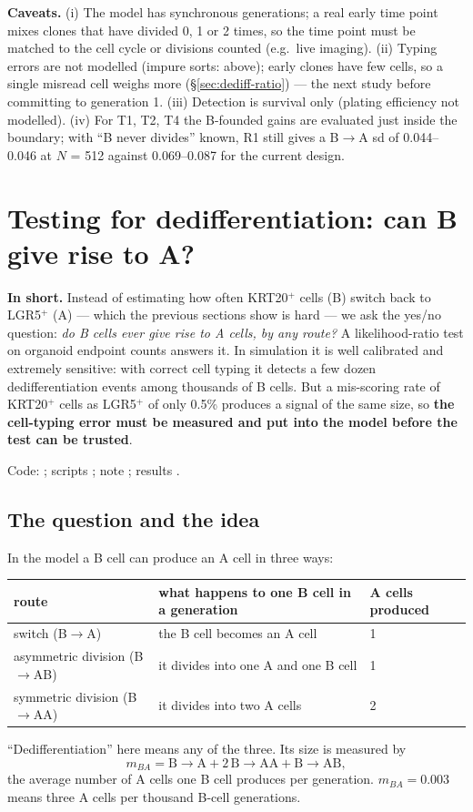 \documentclass[10pt,a4paper]{article}
\newcommand{\BA}{B$\to$A}
\begin{document}
\textbf{Caveats.} (i) The model has synchronous generations; a real early time point mixes clones that have divided 0, 1 or 2 times, so the time point must be matched to the cell cycle or divisions counted (e.g.\ live imaging). (ii) Typing errors are not modelled (impure sorts: above); early clones have few cells, so a single misread cell weighs more (\S\ref{sec:dediff-ratio}) --- the next study before committing to generation 1. (iii) Detection is survival only (plating efficiency not modelled). (iv) For T1, T2, T4 the B-founded gains are evaluated just inside the boundary; with ``B never divides'' known, R1 still gives a \BA{} sd of 0.044--0.046 at $N$ = 512 against 0.069--0.087 for the current design.

\section{Testing for dedifferentiation: can B give rise to A?}\label{sec:dediff}
\begin{keybox}
\textbf{In short.} Instead of estimating how often KRT20$^+$ cells (B) switch back to LGR5$^+$ (A) --- which the previous sections show is hard --- we ask the yes/no question: \emph{do B cells ever give rise to A cells, by any route?} A likelihood-ratio test on organoid endpoint counts answers it. In simulation it is well calibrated and extremely sensitive: with correct cell typing it detects a few dozen dedifferentiation events among thousands of B cells. But a mis-scoring rate of KRT20$^+$ cells as LGR5$^+$ of only 0.5\% produces a signal of the same size, so \textbf{the cell-typing error must be measured and put into the model before the test can be trusted}.
\end{keybox}
Code: ; scripts ; note ; results .

\subsection{The question and the idea}
In the model a B cell can produce an A cell in three ways:
\begin{center}\footnotesize
\begin{tabular}{@{}lll@{}}\toprule
route & what happens to one B cell in a generation & A cells produced \\\midrule
switch (\BA) & the B cell becomes an A cell & 1 \\
asymmetric division (B$\to$AB) & it divides into one A and one B cell & 1 \\
symmetric division (B$\to$AA) & it divides into two A cells & 2 \\\bottomrule
\end{tabular}
\end{center}
``Dedifferentiation'' here means any of the three. Its size is measured by
\[ m_{BA} = \text{B}{\to}\text{A} + 2\,\text{B}{\to}\text{AA} + \text{B}{\to}\text{AB}, \]
the average number of A cells one B cell produces per generation. $m_{BA} = 0.003$ means three A cells per thousand B-cell generations.
\end{document}
